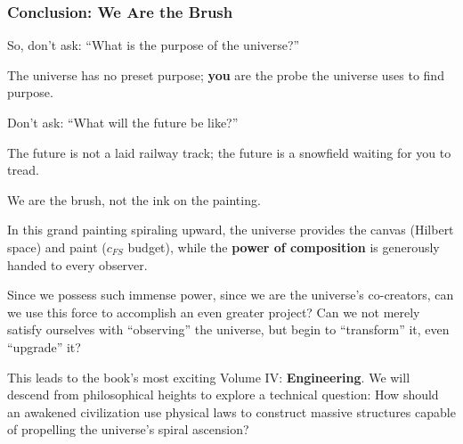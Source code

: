 \subsubsection{Conclusion: We Are the Brush}

So, don't ask: ``What is the purpose of the universe?''

The universe has no preset purpose; \textbf{you} are the probe the universe uses to find purpose.

Don't ask: ``What will the future be like?''

The future is not a laid railway track; the future is a snowfield waiting for you to tread.

We are the brush, not the ink on the painting.

In this grand painting spiraling upward, the universe provides the canvas (Hilbert space) and paint ($c_{FS}$ budget), while the \textbf{power of composition} is generously handed to every observer.

Since we possess such immense power, since we are the universe's co-creators, can we use this force to accomplish an even greater project? Can we not merely satisfy ourselves with ``observing'' the universe, but begin to ``transform'' it, even ``upgrade'' it?

This leads to the book's most exciting Volume IV: \textbf{Engineering}. We will descend from philosophical heights to explore a technical question: How should an awakened civilization use physical laws to construct massive structures capable of propelling the universe's spiral ascension?

